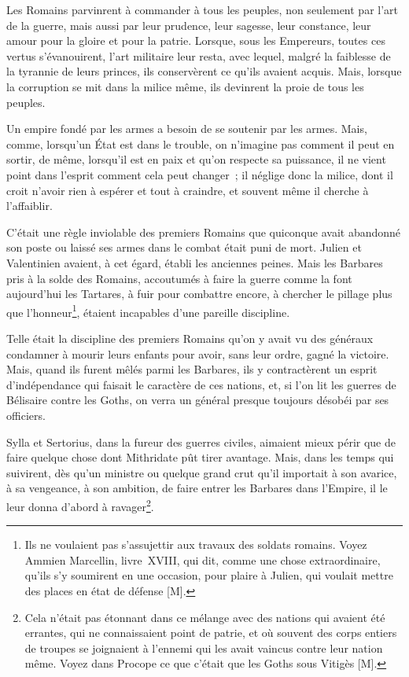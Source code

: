 \documentclass[french,twoside]{book} %
\begin{document}
Les Romains parvinrent à commander à tous les peuples, non seulement par l’art de la guerre, mais aussi par leur prudence, leur sagesse, leur constance, leur amour pour la gloire et pour la patrie. Lorsque, sous les Empereurs, toutes ces vertus s’évanouirent, l’art militaire leur resta, avec lequel, malgré la faiblesse de la tyrannie de leurs princes, ils conservèrent ce qu’ils avaient acquis. Mais, lorsque la corruption se mit dans la milice même, ils devinrent la proie de tous les peuples.\par
Un empire fondé par les armes a besoin de se soutenir par les armes. Mais, comme, lorsqu’un État est dans le trouble, on n’imagine pas comment il peut en sortir, de même, lorsqu’il est en paix et qu’on respecte sa puissance, il ne vient point dans l’esprit comment cela peut changer ; il néglige donc la milice, dont il croit n’avoir rien à espérer et tout à craindre, et souvent même il cherche à l’affaiblir.\par
C’était une règle inviolable des premiers Romains que quiconque avait abandonné son poste ou laissé ses armes dans le combat était puni de mort. Julien et Valentinien avaient, à cet égard, établi les anciennes peines. Mais les Barbares pris à la solde des Romains, accoutumés à faire la guerre comme la font aujourd’hui les Tartares, à fuir pour combattre encore, à chercher le pillage plus que l’honneur\footnote{Ils ne voulaient pas s’assujettir aux travaux des soldats romains. Voyez Ammien Marcellin, livre XVIII, qui dit, comme une chose extraordinaire, qu’ils s’y soumirent en une occasion, pour plaire à Julien, qui voulait mettre des places en état de défense [M].}, étaient incapables d’une pareille discipline.\par
Telle était la discipline des premiers Romains qu’on y avait vu des généraux condamner à mourir leurs enfants pour avoir, sans leur ordre, gagné la victoire. Mais, quand ils furent mêlés parmi les Barbares, ils y contractèrent un esprit d’indépendance qui faisait le caractère de ces nations, et, si l’on lit les guerres de Bélisaire contre les Goths, on verra un général presque toujours désobéi par ses officiers.\par
Sylla et Sertorius, dans la fureur des guerres civiles, aimaient mieux périr que de faire quelque chose dont Mithridate pût tirer avantage. Mais, dans les temps qui suivirent, dès qu’un ministre ou quelque grand crut qu’il importait à son avarice, à sa vengeance, à son ambition, de faire entrer les Barbares dans l’Empire, il le leur donna d’abord à ravager\footnote{Cela n’était pas étonnant dans ce mélange avec des nations qui avaient été errantes, qui ne connaissaient point de patrie, et où souvent des corps entiers de troupes se joignaient à l’ennemi qui les avait vaincus contre leur nation même. Voyez dans Procope ce que c’était que les Goths sous Vitigès [M].}.\par
\end{document}
